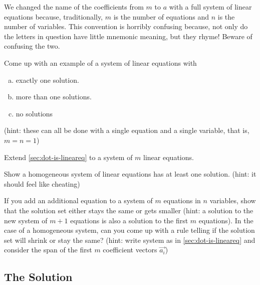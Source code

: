 \begin{Remark}
  \label{sec:confusing}
  We changed the name of the coefficients from $m$ to $a$ with a full system of linear equations because, traditionally, 
  $m$ is the number of equations and $n$ is the number of variables.  
  This convention is horribly confusing because, not only do the letters in question have little mnemonic meaning, but they rhyme!  
  Beware of confusing the two.  
\end{Remark}

\begin{ImpEx}
  Come up with an example of a system of linear equations with
  \begin{enumerate}[a)]
  \item exactly one solution.
  \item more than one solutions.
  \item no solutions
  \end{enumerate}
  (hint: these can all be done with a single equation and a single variable, that is, $m=n=1$)
\end{ImpEx}

\begin{EasyEx}
  Extend \ref{sec:dot-is-lineareq} to a system of $m$ linear equations.  
\end{EasyEx}

\begin{EasyEx}
  Show a homogeneous system of linear equations has at least one solution.  (hint: it should feel like cheating)
\end{EasyEx}

\begin{Ex}
  If you add an additional equation to a system of $m$ equations in $n$ variables, show that the solution set either stays the same or gets smaller (hint: a solution to the new system of $m+1$ equations is also a solution to the first $m$ equations).  
  In the case of a homogeneous system, can you come up with a rule telling if the solution set will shrink or stay the same? (hint: write system as in \ref{sec:dot-is-lineareq} and consider the span of the first $m$ coefficient vectors $\vec{a_i}$)
\end{Ex}


\subsection{The Solution}

